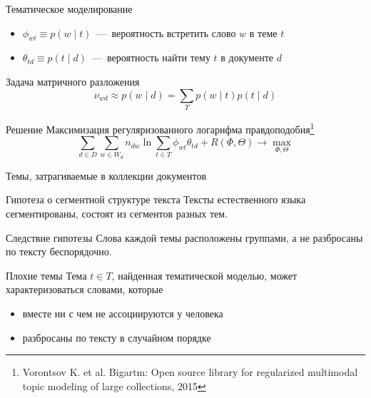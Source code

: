 \documentclass[sans, mathsans, russian]{beamer}
\begin{document}
  
\begin{frame}{Тематическое моделирование}
  \begin{itemize}
    \item $\phi_{wt} \equiv p(w \mid t)$~---~вероятность встретить слово $w$ в теме $t$
    \item $\theta_{td} \equiv p(t \mid d)$~---~вероятность найти тему $t$ в документе $d$
  \end{itemize}
  
  \begin{block}{Задача матричного разложения}
    \[
      \nu_{wd} \approx p(w \mid d) =
      \sum\limits_{T} p(w \mid t) p(t \mid d)
    \]
  \end{block}
  
  
  \begin{block}{Решение}
    Максимизация регуляризованного логарифма правдоподобия\footnote[frame]{Vorontsov K. et al. Bigartm: Open source library for regularized multimodal topic modeling of large collections, 2015}
    \[
      \sum_{d \in D}\sum_{w \in W_d}n_{dw} \ln{\sum_{t \in T} \phi_{wt} \theta_{td}} + R(\Phi, \Theta) \to \max\limits_{\Phi, \Theta}
    \]
  \end{block}
\end{frame}


\begin{frame}{Темы, затрагиваемые в коллекции документов}
  \begin{exampleblock}{Гипотеза о сегментной структуре текста}
    Тексты естественного языка сегментированы, состоят из сегментов разных тем.
  \end{exampleblock}
  
  \begin{block}{Следствие гипотезы}
    Слова каждой темы расположены группами, а не разбросаны по тексту беспорядочно.
  \end{block}
  
  \begin{block}{Плохие темы}
    Тема $t \in T$, найденная тематической моделью, может характеризоваться словами, которые
    \begin{itemize}
    \item вместе ни с чем не ассоциируются у человека 
    \item разбросаны по тексту в случайном порядке
    \end{itemize}
  \end{block}
\end{frame}
\end{document}
